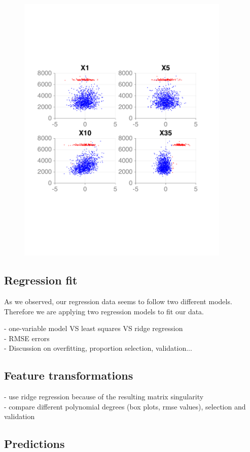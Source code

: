 \documentclass{article} %
\begin{document}
\begin{figure}[!t]
{    \includegraphics[width=4in]{figures/regression/model-separation-rough.pdf}
    \label{fig:twoModelsRough}
  }
  \caption{}
  \end{figure}


  \subsection{Regression fit}
  As we observed, our regression data seems to follow two different models. Therefore we are applying two regression models to fit our data.

  - one-variable model VS least squares VS ridge regression\\
  - RMSE errors\\
  - Discussion on overfitting, proportion selection, validation...

  \subsection{Feature transformations}
  - use ridge regression because of the resulting matrix singularity\\
  - compare different polynomial degrees (box plots, rmse values), selection and validation

  \subsection{Predictions}
\end{document}
